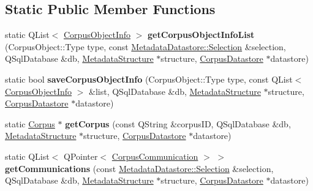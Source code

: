 \subsection*{Static Public Member Functions}
\begin{DoxyCompactItemize}
\item 
\mbox{\label{class_s_q_l_serialiser_metadata_a63cab3a921a0c89c397aa7b731cc998e}} 
static Q\+List$<$ \hyperlink{class_corpus_object_info}{Corpus\+Object\+Info} $>$ {\bfseries get\+Corpus\+Object\+Info\+List} (Corpus\+Object\+::\+Type type, const \hyperlink{class_metadata_datastore_1_1_selection}{Metadata\+Datastore\+::\+Selection} \&selection, Q\+Sql\+Database \&db, \hyperlink{class_metadata_structure}{Metadata\+Structure} $\ast$structure, \hyperlink{class_corpus_datastore}{Corpus\+Datastore} $\ast$datastore)
\item 
\mbox{\label{class_s_q_l_serialiser_metadata_a73b009f2398ec45bbc5fff635717f5df}} 
static bool {\bfseries save\+Corpus\+Object\+Info} (Corpus\+Object\+::\+Type type, const Q\+List$<$ \hyperlink{class_corpus_object_info}{Corpus\+Object\+Info} $>$ \&list, Q\+Sql\+Database \&db, \hyperlink{class_metadata_structure}{Metadata\+Structure} $\ast$structure, \hyperlink{class_corpus_datastore}{Corpus\+Datastore} $\ast$datastore)
\item 
\mbox{\label{class_s_q_l_serialiser_metadata_a261432658ebd6b68866694e878f18a77}} 
static \hyperlink{class_corpus}{Corpus} $\ast$ {\bfseries get\+Corpus} (const Q\+String \&corpus\+ID, Q\+Sql\+Database \&db, \hyperlink{class_metadata_structure}{Metadata\+Structure} $\ast$structure, \hyperlink{class_corpus_datastore}{Corpus\+Datastore} $\ast$datastore)
\item 
\mbox{\label{class_s_q_l_serialiser_metadata_af245b54246a2749fe18f50d937acf6cd}} 
static Q\+List$<$ Q\+Pointer$<$ \hyperlink{class_corpus_communication}{Corpus\+Communication} $>$ $>$ {\bfseries get\+Communications} (const \hyperlink{class_metadata_datastore_1_1_selection}{Metadata\+Datastore\+::\+Selection} \&selection, Q\+Sql\+Database \&db, \hyperlink{class_metadata_structure}{Metadata\+Structure} $\ast$structure, \hyperlink{class_corpus_datastore}{Corpus\+Datastore} $\ast$datastore)
\item 

\end{DoxyCompactItemize}
